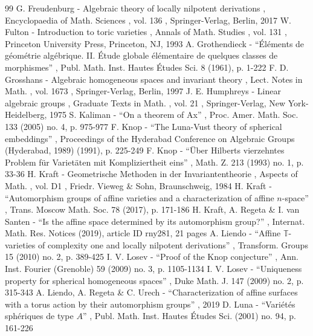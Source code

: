 \documentclass[11pt]{article}
\numberwithin{equation}{section}
\begin{document}
\begin{thebibliography}{99}
 G. Freudenburg - Algebraic theory of locally nilpotent derivations , Encyclopaedia of Math. Sciences , vol. 136 , Springer-Verlag, Berlin, 2017
 W. Fulton - Introduction to toric varieties , Annals of Math. Studies , vol. 131 , Princeton University Press, Princeton, NJ, 1993
 A. Grothendieck - “Éléments de géométrie algébrique. II. Étude globale élémentaire de quelques classes de morphismes” , Publ. Math. Inst. Hautes Études Sci. 8 (1961), p. 1-222
 F. D. Grosshans - Algebraic homogeneous spaces and invariant theory , Lect. Notes in Math. , vol. 1673 , Springer-Verlag, Berlin, 1997
 J. E. Humphreys - Linear algebraic groups , Graduate Texts in Math. , vol. 21 , Springer-Verlag, New York-Heidelberg, 1975
 S. Kaliman - “On a theorem of Ax” , Proc. Amer. Math. Soc. 133 (2005) no. 4, p. 975-977
 F. Knop - “The Luna-Vust theory of spherical embeddings” , Proceedings of the Hyderabad Conference on Algebraic Groups (Hyderabad, 1989) (1991), p. 225-249
 F. Knop - “Über Hilberts vierzehntes Problem für Varietäten mit Kompliziertheit eins” , Math. Z. 213 (1993) no. 1, p. 33-36
 H. Kraft - Geometrische Methoden in der Invariantentheorie , Aspects of Math. , vol. D1 , Friedr. Vieweg \& Sohn, Braunschweig, 1984
 H. Kraft - “Automorphism groups of affine varieties and a characterization of affine $n$-space” , Trans. Moscow Math. Soc. 78 (2017), p. 171-186
 H. Kraft, A. Regeta \& I. van Santen - “Is the affine space determined by its automorphism group?” , Internat. Math. Res. Notices (2019), article ID rny281, 21 pages
 A. Liendo - “Affine $\mathbb{T}$-varieties of complexity one and locally nilpotent derivations” , Transform. Groups 15 (2010) no. 2, p. 389-425
 I. V. Losev - “Proof of the Knop conjecture” , Ann. Inst. Fourier (Grenoble) 59 (2009) no. 3, p. 1105-1134
 I. V. Losev - “Uniqueness property for spherical homogeneous spaces” , Duke Math. J. 147 (2009) no. 2, p. 315-343
 A. Liendo, A. Regeta \& C. Urech - “Characterization of affine surfaces with a torus action by their automorphism groups” , 2019
 D. Luna - “Variétés sphériques de type $A$” , Publ. Math. Inst. Hautes Études Sci. (2001) no. 94, p. 161-226

\end{thebibliography}
\end{document}
